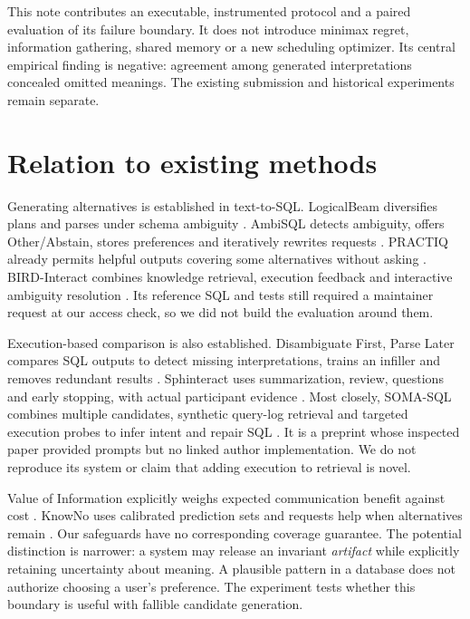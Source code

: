 \documentclass[11pt]{article}
\begin{document}
This note contributes an executable, instrumented protocol and a paired evaluation of its failure boundary. It does not introduce minimax regret, information gathering, shared memory or a new scheduling optimizer. Its central empirical finding is negative: agreement among generated interpretations concealed omitted meanings. The existing submission and historical experiments remain separate.

\section{Relation to existing methods}
Generating alternatives is established in text-to-SQL. LogicalBeam diversifies plans and parses under schema ambiguity \citep{bhaskar-etal-2023-benchmarking}. AmbiSQL detects ambiguity, offers Other/Abstain, stores preferences and iteratively rewrites requests \citep{ding2026ambisql}. PRACTIQ already permits helpful outputs covering some alternatives without asking \citep{dong-etal-2025-practiq}. BIRD-Interact combines knowledge retrieval, execution feedback and interactive ambiguity resolution \citep{huo2026birdinteract}. Its reference SQL and tests still required a maintainer request at our access check, so we did not build the evaluation around them.

Execution-based comparison is also established. Disambiguate First, Parse Later compares SQL outputs to detect missing interpretations, trains an infiller and removes redundant results \citep{saparina-lapata-2025-disambiguate}. Sphinteract uses summarization, review, questions and early stopping, with actual participant evidence \citep{zhao2024sphinteract}. Most closely, SOMA-SQL combines multiple candidates, synthetic query-log retrieval and targeted execution probes to infer intent and repair SQL \citep{somayajula2026soma}. It is a preprint whose inspected paper provided prompts but no linked author implementation. We do not reproduce its system or claim that adding execution to retrieval is novel.

Value of Information explicitly weighs expected communication benefit against cost \citep{dong-etal-2026-value}. KnowNo uses calibrated prediction sets and requests help when alternatives remain \citep{ren2023knowno}. Our safeguards have no corresponding coverage guarantee. The potential distinction is narrower: a system may release an invariant \emph{artifact} while explicitly retaining uncertainty about meaning. A plausible pattern in a database does not authorize choosing a user's preference. The experiment tests whether this boundary is useful with fallible candidate generation.
\end{document}

